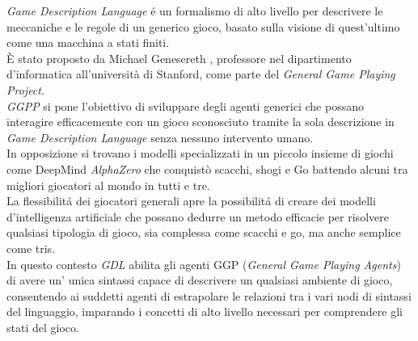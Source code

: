 \textit{Game Description Language} é un formalismo di alto livello per descrivere 
le meccaniche e le regole di un generico gioco,
basato sulla visione di quest'ultimo come una macchina a stati finiti. \\
È stato proposto da Michael Genesereth \cite{GDLSpecification}, professore nel dipartimento d'informatica
all'università di Stanford, come parte del \textit{General Game Playing Project}. \\ 
\textit{GGPP} si pone l'obiettivo di sviluppare degli agenti generici che possano interagire efficacemente
con un gioco sconosciuto tramite la sola descrizione in \textit{Game Description Language} 
senza nessuno intervento umano. \\
In opposizione si trovano i modelli specializzati in un piccolo insieme di giochi come 
DeepMind \textit{AlphaZero} \cite{AlphaZero} che conquistò scacchi, 
shogi e Go battendo alcuni tra migliori giocatori al mondo in tutti e tre. \\
La flessibilitá dei giocatori generali apre la possibilitá di creare dei modelli 
d'intelligenza artificiale 
che possano dedurre un metodo efficacie per risolvere qualsiasi tipologia di gioco,
sia complessa come scacchi e go, ma anche semplice come tris. \\
In questo contesto \textit{GDL} abilita gli agenti GGP (\textit{General Game Playing Agents}) di avere un' 
unica sintassi capace di descrivere un qualsiasi ambiente di gioco, consentendo 
ai suddetti agenti di estrapolare le relazioni tra i vari nodi di sintassi del linguaggio,
imparando i concetti di alto livello necessari per comprendere gli stati del gioco.


